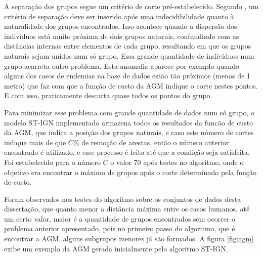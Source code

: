 A separação dos grupos segue um critério de corte pré-estabelecido. Segundo \cite{simposioNeg2003}, um critério de separação deve ser inserido após uma indecidibilidade quanto à naturalidade dos grupos encontrados. Isso acontece quando a dispersão dos indivíduos está muito próxima de dois grupos naturais, confundindo com as distâncias internas entre elementos de cada grupo, resultando em que os grupos naturais sejam unidos num só grupo. Essa grande quantidade de indivíduos num grupo acarreta outro problema. Esta anomalia aparece por exemplo quando alguns dos casos de endemias na base de dados estão tão próximos (menos de 1 metro) que faz com que a função de custo da \acrshort{AGM} indique o corte nestes pontos. E com isso, praticamente descarta quase todos os pontos do grupo.

Para minimizar esse problema com grande quantidade de dados num só grupo, o modelo \acrshort{ST-IGN} implementado armazena todos os resultados da funcão de custo da \acrshort{AGM}, que indica a posição dos grupos naturais, e caso este número de cortes indique mais de que ${C}$\% de remoção de arestas, então o número anterior encontrado é utilizado, e esse processo é feito até que a condição seja satisfeita. Foi estabelecido para o número ${C}$ o valor 70 após testes no algoritmo, onde o objetivo era encontrar o máximo de grupos após o corte determinado pela função de custo.

Foram observados nos testes do algoritmo sobre os conjuntos de dados desta dissertação, que quanto menor a distância máxima entre os casos humanos, até um certo valor, maior é a quantidade de grupos encontrados sem ocorrer o problema anterior apresentado, pois no primeiro passo do algoritmo, que é encontrar a \acrshort{AGM}, alguns subgrupos menores já são formados.
A figura \ref{fig:agm} exibe um exemplo da \acrshort{AGM} gerada inicialmente pelo algoritmo \acrshort{ST-IGN}.

\begin{figure}[!ht]
	\centering	
\end{figure}
\FloatBarrier

